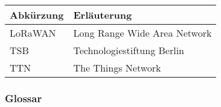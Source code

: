 \documentclass[
11pt,
a4paper,
ngerman,
]{article}
\begin{document}
\begin{table}[H] %
	\centering
	\begin{tabular}{ |l|l| } %
		\hline  %
		\rowcolor[gray]{.8}%
		\rule{0pt}{18pt}%
		\textbf{Abkürzung} & \textbf{Erläuterung} \\
		\hline  %
		LoRaWAN & Long Range Wide Area Network \\
		\hline
		TSB & Technologiestiftung Berlin \\
		\hline
		TTN & The Things Network \\
		\hline
	\end{tabular}
\end{table}

\subsubsection{Glossar}
\end{document}
